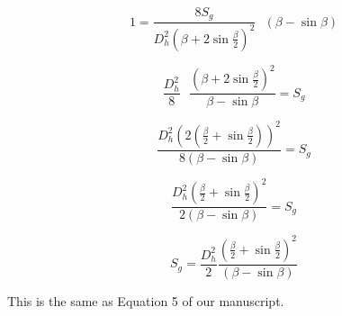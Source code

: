 \documentclass[11pt]{article}
\begin{document}
\begin{itemize}
  
  \begin{equation}
    1 = \frac{8 S_g}{D_h^2 (\beta +2\sin\frac{\beta}{2})^2} ~~~ (\beta-\sin\beta)
  \end{equation}


  \begin{equation}
    \frac{D_h^2}{8} ~~~ \frac{(\beta+2\sin\frac{\beta}{2})^2}{\beta - \sin \beta} = S_g
  \end{equation}

  \begin{equation}
    \frac{D_h^2 (2(\frac{\beta}{2}+\sin \frac{\beta}{2}))^2}{8(\beta - \sin \beta)} = S_g
  \end{equation}


   \begin{equation}
    \frac{D_h^2 (\frac{\beta}{2}+\sin \frac{\beta}{2})^2}{2(\beta - \sin \beta)} = S_g
  \end{equation}


  \begin{equation}
       S_g = \frac{D_h^2}{2} \frac{(\frac{\beta}{2}+\sin \frac{\beta}{2})^2}{(\beta - \sin \beta)}  
  \end{equation}

  This is the same as Equation 5 of our manuscript.

  

\end{itemize}

 

\end{document}
